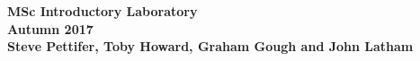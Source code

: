 
\begin{center}
\bfseries\Large MSc Introductory Laboratory\\[2ex]
\large Autumn 2017\\[2ex]
\normalsize Steve Pettifer, Toby Howard, Graham Gough and John Latham
\end{center}






